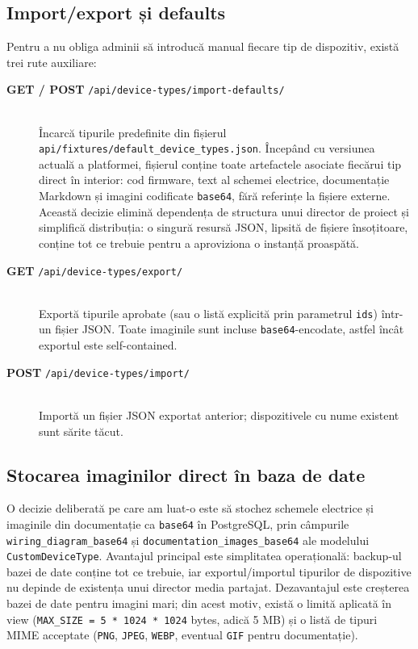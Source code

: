 \subsection{Import/export și defaults}
Pentru a nu obliga adminii să introducă manual fiecare tip de dispozitiv, există trei rute auxiliare:
\begin{description}
    \item[\textbf{GET / POST} \texttt{/api/device-types/import-defaults/}] \hfill \\
    Încarcă tipurile predefinite din fișierul \texttt{api/fixtures/default\_device\_types.json}. Începând cu versiunea actuală a platformei, fișierul conține toate artefactele asociate fiecărui tip direct în interior: cod firmware, text al schemei electrice, documentație Markdown și imagini codificate \texttt{base64}, fără referințe la fișiere externe. Această decizie elimină dependența de structura unui director de proiect și simplifică distribuția: o singură resursă JSON, lipsită de fișiere însoțitoare, conține tot ce trebuie pentru a aproviziona o instanță proaspătă.
    \item[\textbf{GET} \texttt{/api/device-types/export/}] \hfill \\
    Exportă tipurile aprobate (sau o listă explicită prin parametrul \texttt{ids}) într-un fișier JSON. Toate imaginile sunt incluse \texttt{base64}-encodate, astfel încât exportul este self-contained.
    \item[\textbf{POST} \texttt{/api/device-types/import/}] \hfill \\
    Importă un fișier JSON exportat anterior; dispozitivele cu nume existent sunt sărite tăcut.
\end{description}

\subsection{Stocarea imaginilor direct în baza de date}
O decizie deliberată pe care am luat-o este să stochez schemele electrice și imaginile din documentație ca \texttt{base64} în PostgreSQL, prin câmpurile \texttt{wiring\_diagram\_base64} și \texttt{documentation\_images\_base64} ale modelului \texttt{CustomDeviceType}. Avantajul principal este simplitatea operațională: backup-ul bazei de date conține tot ce trebuie, iar exportul/importul tipurilor de dispozitive nu depinde de existența unui director media partajat. Dezavantajul este creșterea bazei de date pentru imagini mari; din acest motiv, există o limită aplicată în view (\texttt{MAX\_SIZE = 5 * 1024 * 1024} bytes, adică 5 MB) și o listă de tipuri MIME acceptate (\texttt{PNG}, \texttt{JPEG}, \texttt{WEBP}, eventual \texttt{GIF} pentru documentație).

